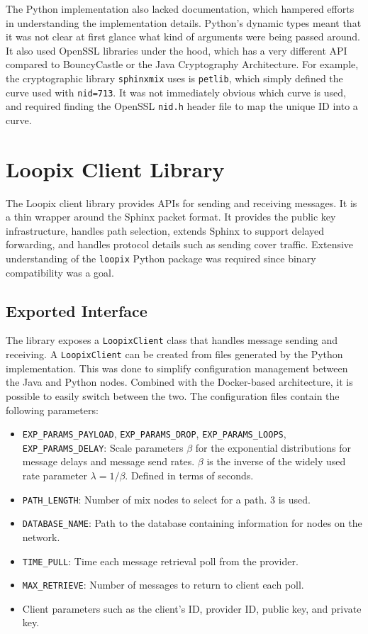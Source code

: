 \documentclass[final,dissertation.tex]{subfiles}
\begin{document}
The Python implementation also lacked documentation, which hampered efforts in understanding the implementation details. Python's dynamic types meant that it was not clear at first glance what kind of arguments were being passed around. It also used OpenSSL libraries under the hood, which has a very different API compared to BouncyCastle or the Java Cryptography Architecture. For example, the cryptographic library \verb|sphinxmix| uses is \verb|petlib|, which simply defined the curve used with \verb|nid=713|. It was not immediately obvious which curve is used, and required finding the OpenSSL \verb|nid.h| header file to map the unique ID into a curve.

\section{Loopix Client Library}

The Loopix client library provides APIs for sending and receiving messages. It is a thin wrapper around the Sphinx packet format. It provides the public key infrastructure, handles path selection, extends Sphinx to support delayed forwarding, and handles protocol details such as sending cover traffic. Extensive understanding of the \verb|loopix| Python package was required since binary compatibility was a goal.

\subsection{Exported Interface}

The library exposes a \verb|LoopixClient| class that handles message sending and receiving. A \verb|LoopixClient| can be created from files generated by the Python implementation. This was done to simplify configuration management between the Java and Python nodes. Combined with the Docker-based architecture, it is possible to easily switch between the two. The configuration files contain the following parameters:

\begin{itemize}
	\setlength\itemsep{0em}
	\item \verb|EXP_PARAMS_PAYLOAD|, \verb|EXP_PARAMS_DROP|, \verb|EXP_PARAMS_LOOPS|, \verb|EXP_PARAMS_DELAY|: Scale parameters $\beta$ for the exponential distributions for message delays and message send rates. $\beta$ is the inverse of the widely used rate parameter $\lambda = 1/\beta$. Defined in terms of seconds.
	\item \verb|PATH_LENGTH|: Number of mix nodes to select for a path. 3 is used.
	\item \verb|DATABASE_NAME|: Path to the database containing information for nodes on the network.
	\item \verb|TIME_PULL|: Time each message retrieval poll from the provider.
	\item \verb|MAX_RETRIEVE|: Number of messages to return to client each poll.
	\item Client parameters such as the client's ID, provider ID, public key, and private key.
\end{itemize} 
\end{document}
